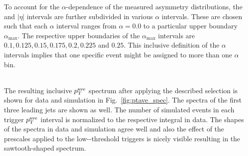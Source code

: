 To account for the $\alpha$-dependence of the measured asymmetry distributions, the \ptave and $|\eta|$ intervals are further subdivided in various $\alpha$ intervals. These are chosen such that each $\alpha$ interval ranges from $\alpha = 0.0$ to a particular upper boundary $\alpha_\mathrm{max}$. The respective upper boundaries of the $\alpha_\mathrm{max}$ intervals are $0.1, 0.125, 0.15, 0.175, 0.2, 0.225$ and $0.25$. This inclusive definition of the $\alpha$ intervals implies that one specific event might be assigned to more than one $\alpha$ bin. 
\begin{table}[!t]
\centering
\caption{Overview of the $|\eta|$ and $\pt^\mathrm{ave}$ interval boundaries used for the resolution measurement.}
\label{tab:binning}
\end{table} 
\\
The resulting inclusive $\pt^\mathrm{ave}$ spectrum after applying the described selection is shown for data and simulation in Fig.~\ref{fig:ptave_spec}. The \pt spectra of the first three leading jets are shown as well. The number of simulated events in each trigger $\pt^\mathrm{ave}$ interval is normalized to the respective integral in data. The shapes of the spectra in data and simulation agree well and also the effect of the prescales applied to the low-\ptave-threshold triggers is nicely visible resulting in the sawtooth-shaped \ptave spectrum.  
